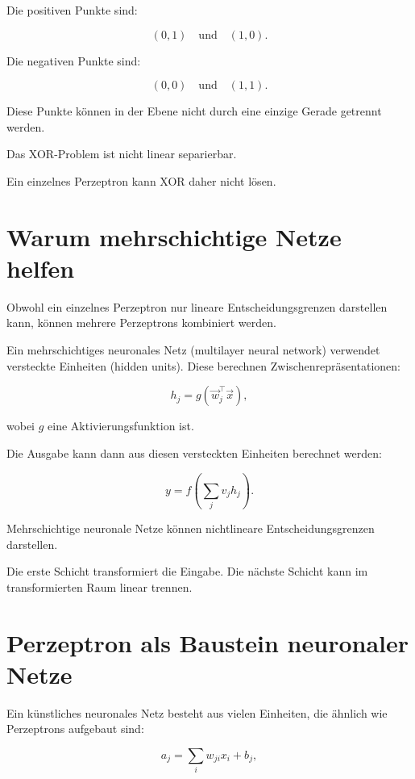 Die positiven Punkte sind:

\[
    (0,1)
    \quad
    \text{und}
    \quad
    (1,0).
\]

Die negativen Punkte sind:

\[
    (0,0)
    \quad
    \text{und}
    \quad
    (1,1).
\]

Diese Punkte können in der Ebene nicht durch eine einzige Gerade getrennt werden.

\begin{conceptbox}
Das XOR-Problem ist nicht linear separierbar.

Ein einzelnes Perzeptron kann XOR daher nicht lösen.
\end{conceptbox}

\section{Warum mehrschichtige Netze helfen}

Obwohl ein einzelnes Perzeptron nur lineare Entscheidungsgrenzen darstellen kann, können mehrere Perzeptrons kombiniert werden.

Ein mehrschichtiges neuronales Netz (multilayer neural network) verwendet versteckte Einheiten (hidden units).
Diese berechnen Zwischenrepräsentationen:

\[
    h_j
    =
    g(\vec{w}_j^{\top}\vec{x}),
\]

wobei \(g\) eine Aktivierungsfunktion ist.

Die Ausgabe kann dann aus diesen versteckten Einheiten berechnet werden:

\[
    y
    =
    f\left(
        \sum_j
        v_j h_j
    \right).
\]

\begin{conceptbox}
Mehrschichtige neuronale Netze können nichtlineare Entscheidungsgrenzen darstellen.

Die erste Schicht transformiert die Eingabe.
Die nächste Schicht kann im transformierten Raum linear trennen.
\end{conceptbox}

\section{Perzeptron als Baustein neuronaler Netze}

Ein künstliches neuronales Netz besteht aus vielen Einheiten, die ähnlich wie Perzeptrons aufgebaut sind:

\[
    a_j
    =
    \sum_i
    w_{ji}x_i
    +
    b_j,
\]

